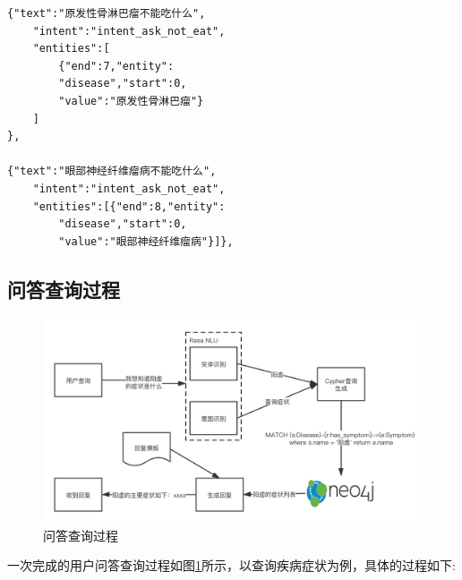 \begin{lstlisting}[caption={Rasa NLU训练数据}, label={lst:train-data}, basicstyle=\normalsize]
{"text":"原发性骨淋巴瘤不能吃什么",
    "intent":"intent_ask_not_eat",
    "entities":[
        {"end":7,"entity":
        "disease","start":0,
        "value":"原发性骨淋巴瘤"}
    ]
},

{"text":"眼部神经纤维瘤病不能吃什么",
    "intent":"intent_ask_not_eat",
    "entities":[{"end":8,"entity":
        "disease","start":0,
        "value":"眼部神经纤维瘤病"}]},
\end{lstlisting}


\subsection{问答查询过程}

\begin{figure}[h]
    \centering
    \includegraphics[width=15cm]{images/cypher.png}
    \caption{问答查询过程}
    \label{fig:query_process}
\end{figure}

一次完成的用户问答查询过程如图\ref{fig:query_process}所示，以查询疾病症状为例，具体的过程如下:

